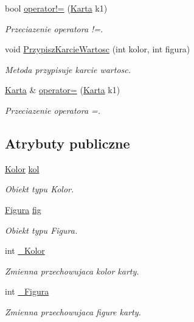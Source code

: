 \begin{DoxyCompactItemize}
bool \hyperlink{class_karta_a311524f97ea1b838589a9be5c01d0b8e}{operator!=} (\hyperlink{class_karta}{Karta} k1)
\begin{DoxyCompactList}\small\item\em Przeciazenie operatora !=. \end{DoxyCompactList}\item 
void \hyperlink{class_karta_a259111232953dbf3159dcc817676a52d}{Przypisz\-Karcie\-Wartosc} (int kolor, int figura)
\begin{DoxyCompactList}\small\item\em Metoda przypisuje karcie wartosc. \end{DoxyCompactList}\item 
\hyperlink{class_karta}{Karta} \& \hyperlink{class_karta_a81c5e69f8365fe48b51f8e9e77555b3f}{operator=} (\hyperlink{class_karta}{Karta} k1)
\begin{DoxyCompactList}\small\item\em Przeciazenie operatora =. \end{DoxyCompactList}\end{DoxyCompactItemize}
\subsection*{Atrybuty publiczne}
\begin{DoxyCompactItemize}
\item 
\hyperlink{class_karta_ab4fee277728f803ca6687783572b2416}{Kolor} \hyperlink{class_karta_a1d16b54a6d9d8f18ed2905eef20d3c58}{kol}
\begin{DoxyCompactList}\small\item\em Obiekt typu Kolor. \end{DoxyCompactList}\item 
\hyperlink{class_karta_a7f71c15a03e9b8d4103c8734f2ec1f1b}{Figura} \hyperlink{class_karta_abed8c8f7d00c0728e561b1c863fe9606}{fig}
\begin{DoxyCompactList}\small\item\em Obiekt typu Figura. \end{DoxyCompactList}\item 
int \hyperlink{class_karta_ad81428e13c07b3c6bad8c4c79066af05}{\-\_\-\-Kolor}
\begin{DoxyCompactList}\small\item\em Zmienna przechowujaca kolor karty. \end{DoxyCompactList}\item 
int \hyperlink{class_karta_a556ff424e7a67c3e54ee275961163636}{\-\_\-\-Figura}
\begin{DoxyCompactList}\small\item\em Zmienna przechowujaca figure karty. \end{DoxyCompactList}\end{DoxyCompactItemize}


